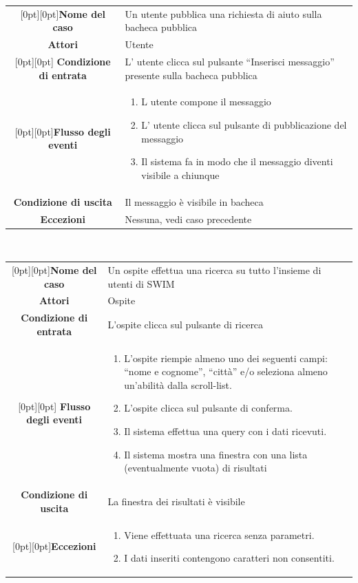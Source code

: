 \documentclass[a4paper,12pt]{article}
\begin{document}
\begin{tabularx}{\textwidth}{|c|X|}
\rowcolor[gray]{.9}\hline  \raisebox{-1ex}[0pt][0pt]{\textbf{Nome del caso}} & Un utente pubblica una richiesta di aiuto sulla bacheca pubblica \\
\rowcolor[gray]{.9}\hline  \textbf{Attori} & Utente \\ 
\rowcolor[gray]{.9}\hline \raisebox{-1ex}[0pt][0pt]{ \textbf{Condizione di entrata}} & L' utente clicca sul pulsante “Inserisci messaggio” presente sulla bacheca pubblica \\
\rowcolor[gray]{.9}\hline  \raisebox{-8ex}[0pt][0pt]{\textbf{Flusso degli eventi}} & 
\begin{enumerate}
\itemsep0em 
\item L utente compone il messaggio
\item L' utente clicca sul pulsante di pubblicazione del messaggio
\item Il sistema fa in modo che il messaggio diventi visibile a chiunque
\end{enumerate}
 \\ 
\rowcolor[gray]{.9}\hline \textbf{Condizione di uscita} & Il messaggio è visibile in bacheca \\
\rowcolor[gray]{.9}\hline \textbf{Eccezioni} & Nessuna, vedi caso precedente
\\
\hline 
\end{tabularx} \\[1\baselineskip]
\begin{tabularx}{\textwidth}{|c|X|}
\rowcolor[gray]{.9}\hline  \raisebox{-1ex}[0pt][0pt]{\textbf{Nome del caso}} & Un ospite effettua una ricerca su tutto l'insieme di utenti di SWIM \\
\rowcolor[gray]{.9}\hline  \textbf{Attori} & Ospite \\ 
\rowcolor[gray]{.9}\hline  \textbf{Condizione di entrata} & L'ospite clicca sul pulsante di ricerca \\
\rowcolor[gray]{.9}\hline \raisebox{-10ex}[0pt][0pt]{ \textbf{Flusso degli eventi}} & 
\begin{enumerate}
\itemsep0em 
\item L'ospite riempie almeno uno dei seguenti campi: “nome e cognome”, “città” e/o seleziona almeno un'abilità dalla scroll-list.
\item L'ospite clicca sul pulsante di conferma.
\item Il sistema effettua una query con i dati ricevuti.
\item Il sistema mostra una finestra con una lista (eventualmente vuota) di risultati
\end{enumerate}
 \\ 
\rowcolor[gray]{.9}\hline  \textbf{Condizione di uscita} & La finestra dei risultati è visibile \\
\rowcolor[gray]{.9}\hline  \raisebox{-4ex}[0pt][0pt]{\textbf{Eccezioni} }&
\begin{enumerate}
\itemsep0em
\item Viene effettuata una ricerca senza parametri.
\item I dati inseriti contengono caratteri non consentiti.
\end{enumerate}
\\
\hline 
\end{tabularx} \clearpage
\end{document}

